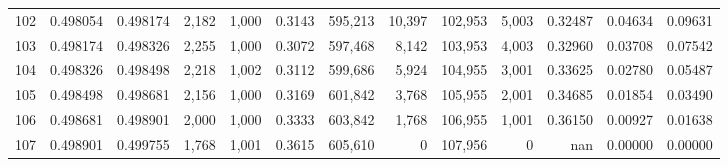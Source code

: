 \begin{tabular}{rrrrrrrrrrrrr}
102 &  0.498054 &  0.498174 &   2,182 &  1,000 &                                     0.3143 &  595,213 &   10,397 &  102,953 &    5,003 &  0.32487 &  0.04634 &  0.09631 \\
103 &  0.498174 &  0.498326 &   2,255 &  1,000 &                                     0.3072 &  597,468 &    8,142 &  103,953 &    4,003 &  0.32960 &  0.03708 &  0.07542 \\
104 &  0.498326 &  0.498498 &   2,218 &  1,002 &                                     0.3112 &  599,686 &    5,924 &  104,955 &    3,001 &  0.33625 &  0.02780 &  0.05487 \\
105 &  0.498498 &  0.498681 &   2,156 &  1,000 &                                     0.3169 &  601,842 &    3,768 &  105,955 &    2,001 &  0.34685 &  0.01854 &  0.03490 \\
106 &  0.498681 &  0.498901 &   2,000 &  1,000 &                                     0.3333 &  603,842 &    1,768 &  106,955 &    1,001 &  0.36150 &  0.00927 &  0.01638 \\
107 &  0.498901 &  0.499755 &   1,768 &  1,001 &                                     0.3615 &  605,610 &        0 &  107,956 &        0 &      nan &  0.00000 &  0.00000 \\
\bottomrule
\end{tabular}
